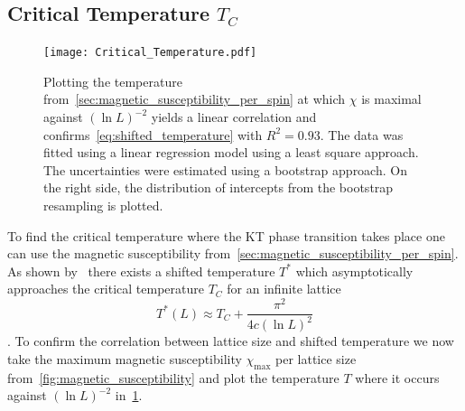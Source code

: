 \subsection{Critical Temperature \texorpdfstring{$T_C$}{T}}\label{sec:critical_temperature}
\begin{figure}
	\centering
	\texttt{[image: Critical\_Temperature.pdf]}
	\caption[Obtaining the critical temperature $\texorpdfstring{T_C}{T}$ by plotting the temperature $\texorpdfstring{T}{T}$ at $\texorpdfstring{\chi_\text{max}}{the magnetic susceptibility is maximum}$ against $\texorpdfstring{(\ln{L})^{-2}}{inverse logarithmic squared lattice size}$]{Plotting the temperature from~\cref{sec:magnetic_susceptibility_per_spin} at which $\chi$ is maximal against $(\ln{L})^{-2}$ yields a linear correlation and confirms~\cref{eq:shifted_temperature} with $R^2 = \num{0.93}$. The data was fitted using a linear regression model using a least square approach. The uncertainties were estimated using a bootstrap approach. On the right side, the distribution of intercepts from the bootstrap resampling is plotted.}
	\label{fig:critical_temperature}
\end{figure}
To find the critical temperature where the KT phase transition takes place one can use the magnetic susceptibility from~\cref{sec:magnetic_susceptibility_per_spin}. As shown by~\citet{shifted} there exists a shifted temperature $T^*$ which asymptotically approaches the critical temperature $T_C$ for an infinite lattice
\begin{equation}\label{eq:shifted_temperature}
	T^*(L) \approx T_C + \frac{\pi^2}{4c (\ln{L})^2}
\end{equation}
\cite[eq. 3]{shifted}. To confirm the correlation between lattice size and shifted temperature we now take the maximum magnetic susceptibility $\chi_\text{max}$ per lattice size from~\cref{fig:magnetic_susceptibility} and plot the temperature $T$ where it occurs against $(\ln{L})^{-2}$ in~\cref{fig:critical_temperature}.

